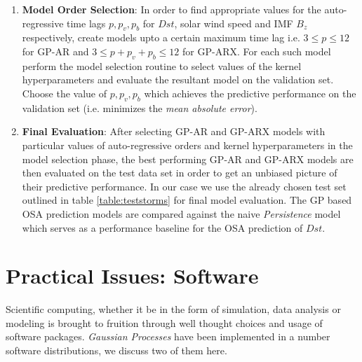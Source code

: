 \documentclass{article}
\begin{document}
\begin{enumerate}
\item \textbf{Model Order Selection}: In order to find appropriate
  values for the auto-regressive time lags $p, p_v, p_b$ for $Dst$,
  solar wind speed and IMF $B_z$ respectively, create models upto a
  certain maximum time lag i.e. $3 \leq p \leq 12$ for GP-AR and $3
  \leq p + p_v + p_b \leq 12$ for GP-ARX. For each such model perform
  the model selection routine to select values of the kernel
  hyperparameters and evaluate the resultant model on the validation
  set. Choose the value of $p, p_v, p_b$ which achieves the predictive
  performance on the validation set (i.e. minimizes the \emph{mean
    absolute error}).

\item \textbf{Final Evaluation}: After selecting GP-AR and GP-ARX models with particular values of auto-regressive orders and kernel hyperparameters in the model selection phase, the best performing GP-AR and GP-ARX models are then evaluated on the test data set in order to get an unbiased picture of their predictive performance. In our case we use the already chosen test set outlined in table \ref{table:teststorms} for final model evaluation. The GP based OSA prediction models are compared against the naive \emph{Persistence} model which serves as a performance baseline for the OSA prediction of $Dst$.

\end{enumerate}

\section{Practical Issues: Software}

Scientific computing, whether it be in the form of simulation, data analysis or modeling is brought to fruition through well thought choices and usage of software packages. \emph{Gaussian Processes} have been implemented in a number software distributions, we discuss two of them here.
\end{document}
